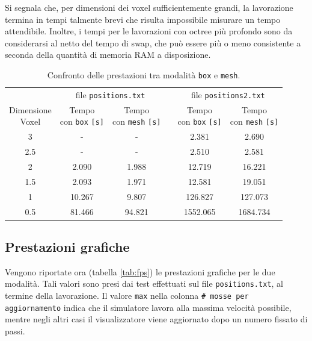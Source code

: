 Si segnala che, per dimensioni dei voxel sufficientemente grandi, la lavorazione termina in tempi talmente brevi che risulta impossibile misurare un tempo attendibile. Inoltre, i tempi per le lavorazioni con octree più profondo sono da considerarsi al netto del tempo di swap, che può essere più o meno consistente a seconda della quantità di memoria RAM a disposizione.

\begin{center}
  \begin{table}[hb]
   \centering
      \begin{tabular}{cccccc}
        \toprule
        & \multicolumn{2}{c}{file \texttt{positions.txt}} & & \multicolumn{2}{c}{file \texttt{positions2.txt}}\\
        \cmidrule(r){2-3}\cmidrule(r){5-6}
          \shortstack{Dimensione\\ Voxel} & \shortstack{Tempo \\con \texttt{box} \texttt{[s]}} & \shortstack{Tempo \\con \texttt{mesh} \texttt{[s]}} & & \shortstack{Tempo \\con \texttt{box} \texttt{[s]}} & \shortstack{Tempo \\con \texttt{mesh} \texttt{[s]}}\\
        \midrule
          3   & -      & -      & & 2.381    & 2.690    \\
          2.5 & -      & -      & & 2.510    & 2.581    \\
          2   & 2.090  & 1.988  & & 12.719   & 16.221   \\
          1.5 & 2.093  & 1.971  & & 12.581   & 19.051   \\
          1   & 10.267 & 9.807  & & 126.827  & 127.073  \\
          0.5 & 81.466 & 94.821 & & 1552.065 & 1684.734 \\
        \bottomrule
      \end{tabular}
      \caption{Confronto delle prestazioni tra modalità \texttt{box} e \texttt{mesh}.}
      \label{tab:confrontoBoxMesh}
  \end{table}
\end{center}

\subsection{Prestazioni grafiche}
Vengono riportate ora (tabella \ref{tab:fps}) le prestazioni grafiche per le due modalità. Tali valori sono presi dai test effettuati sul file \texttt{positions.txt}, al termine della lavorazione. Il valore \texttt{max} nella colonna \texttt{\# mosse per aggiornamento} indica che il simulatore lavora alla massima velocità possibile, mentre negli altri casi il visualizzatore viene aggiornato dopo un numero fissato di passi.

